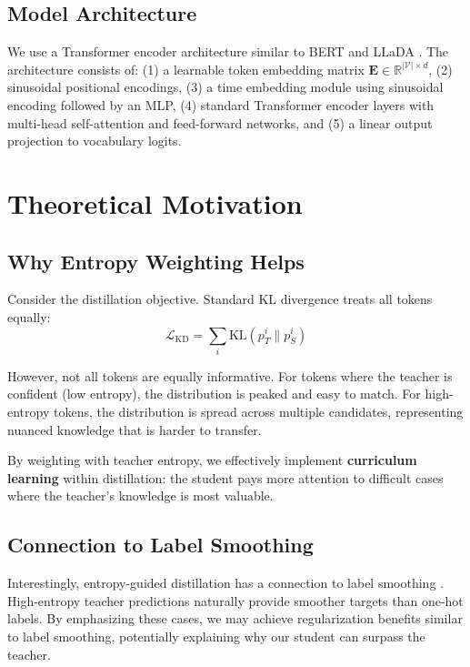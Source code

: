 \documentclass[conference]{IEEEtran}
\begin{document}
\subsection{Model Architecture}

We use a Transformer encoder architecture similar to BERT \cite{devlin2019bert} and LLaDA \cite{nie2025llada}. The architecture consists of: (1) a learnable token embedding matrix $\mathbf{E} \in \mathbb{R}^{|\mathcal{V}| \times d}$, (2) sinusoidal positional encodings, (3) a time embedding module using sinusoidal encoding followed by an MLP, (4) standard Transformer encoder layers with multi-head self-attention and feed-forward networks, and (5) a linear output projection to vocabulary logits.

\section{Theoretical Motivation}
\label{sec:theory}

\subsection{Why Entropy Weighting Helps}

Consider the distillation objective. Standard KL divergence treats all tokens equally:
\begin{equation}
    \mathcal{L}_{\text{KD}} = \sum_i \text{KL}(p_T^i \| p_S^i)
\end{equation}

However, not all tokens are equally informative. For tokens where the teacher is confident (low entropy), the distribution is peaked and easy to match. For high-entropy tokens, the distribution is spread across multiple candidates, representing nuanced knowledge that is harder to transfer.

By weighting with teacher entropy, we effectively implement \textbf{curriculum learning} within distillation: the student pays more attention to difficult cases where the teacher's knowledge is most valuable.

\subsection{Connection to Label Smoothing}

Interestingly, entropy-guided distillation has a connection to label smoothing \cite{muller2019does}. High-entropy teacher predictions naturally provide smoother targets than one-hot labels. By emphasizing these cases, we may achieve regularization benefits similar to label smoothing, potentially explaining why our student can surpass the teacher.
\end{document}
